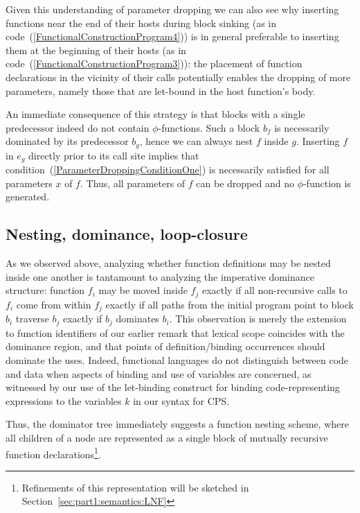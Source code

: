 Given this understanding of parameter dropping we can also see why
inserting functions near the end of their hosts during block sinking
(as in code~(\ref{FunctionalConstructionProgram4})) is in general
preferable to inserting them at the beginning of their hosts (as in
code~(\ref{FunctionalConstructionProgram3})): the placement of
function declarations in the vicinity of their calls potentially
enables the dropping of more parameters, namely those that are
let-bound in the host function's body.

An immediate consequence of this strategy is that blocks with a single
predecessor indeed do not contain $\phi$-functions. Such a block $b_f$
is necessarily dominated by its predecessor $b_g$, hence we can always
nest $f$ inside $g$. Inserting $f$ in $e_g$ directly prior to its call
site implies that condition~(\ref{ParameterDroppingConditionOne}) is
necessarily satisfied for all parameters $x$ of $f$. Thus, all
parameters of $f$ can be dropped and no $\phi$-function is generated.

\subsection{Nesting, dominance, loop-closure}
\label{section:semantics:loopclosure}
As we observed above, analyzing whether function definitions may be
nested inside one another is tantamount to analyzing the imperative
dominance structure: function $f_i$ may be moved inside $f_j$ exactly
if all non-recursive calls to $f_i$ come from within $f_j$ exactly if
all paths from the initial program point to block $b_i$ traverse $b_j$
exactly if $b_j$ dominates $b_i$.  This observation is merely the
extension to function identifiers of our earlier remark that lexical
scope coincides with the dominance region, and that points of
definition/binding occurrences should dominate the uses. Indeed,
functional languages do not distinguish between code and data when
aspects of binding and use of variables are concerned, as witnessed by
our use of the let-binding construct for binding code-representing
expressions to the variables $k$ in our syntax for CPS.

Thus, the dominator tree immediately suggests a function nesting
scheme, where all children of a node are represented as a single block
of mutually recursive function declarations\footnote{Refinements of
this representation will be sketched in
Section~\ref{sec:part1:semantics:LNF}}.


